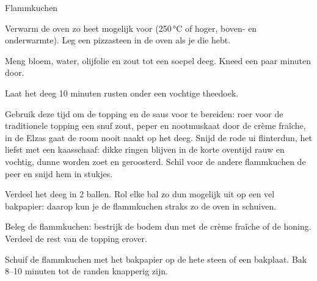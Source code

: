 \begin{recipe}{Flammkuchen}
\begin{steps}
  \item Verwarm de oven zo heet mogelijk voor (250\,°C of hoger, boven- en
        onderwarmte). Leg een pizzasteen in de oven als je die hebt.
  \item Meng bloem, water, olijfolie en zout tot een soepel deeg. Kneed een paar
        minuten door.
  \item Laat het deeg 10 minuten rusten onder een vochtige theedoek.
  \item Gebruik deze tijd om de topping en de saus voor te bereiden: roer
        voor de traditionele topping een snuf zout, peper en nootmuskaat
        door de crème fraîche, in de Elzas gaat de room nooit naakt op het
        deeg. Snijd de rode ui flinterdun, het liefst met een kaasschaaf:
        dikke ringen blijven in de korte oventijd rauw en vochtig,
        dunne worden zoet en geroosterd. Schil voor de andere flammkuchen de
        peer en snijd hem in stukjes.
  \item Verdeel het deeg in 2 ballen. Rol elke bal zo dun mogelijk uit op een
        vel bakpapier: daarop kun je de flammkuchen straks zo de oven in schuiven.
  \item Beleg de flammkuchen: bestrijk de bodem dun met de crème fraîche of de
        honing. Verdeel de rest van de topping erover.
  \item Schuif de flammkuchen met het bakpapier op de hete steen of een
        bakplaat. Bak 8--10 minuten tot de randen knapperig zijn.
\end{steps}

\end{recipe}

